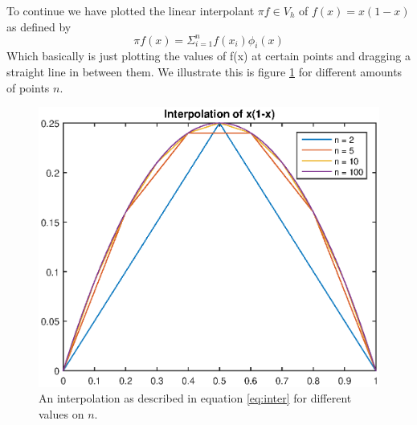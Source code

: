\documentclass[11pt]{article}
\begin{document}
To continue we have plotted the linear interpolant $\pi  f \in V_h$ of $f(x) = x(1-x)$ as defined by
\begin{equation}
	 \pi f(x) = \Sigma^n_{i=1} f(x_i) \phi_i(x)
	 \label{eq:inter}
\end{equation}
Which basically is just plotting the values of f(x) at certain points and dragging a straight line in between them. We illustrate this is figure \ref{fig:inter} for different amounts of points $n$. 
\begin{figure}[H]
	\centering
	\includegraphics[width=1\textwidth]{../ex1/inter}
	\caption{An interpolation as described in equation \ref{eq:inter} for different values on $n$.}
	\label{fig:inter}
\end{figure}
\end{document}
